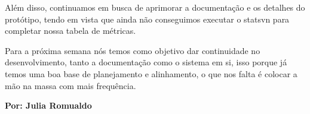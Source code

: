 Além disso, continuamos em busca de aprimorar a documentação e os detalhes do protótipo, tendo em vista que ainda não conseguimos executar o \gls{statsvn} para completar nossa tabela de métricas.

Para a próxima semana nós temos como objetivo dar continuidade no desenvolvimento, tanto a documentação como o sistema em si, isso porque já temos uma boa base de planejamento e alinhamento, o que nos falta é colocar a mão na massa com mais frequência.

\textbf{Por: Julia Romualdo}
